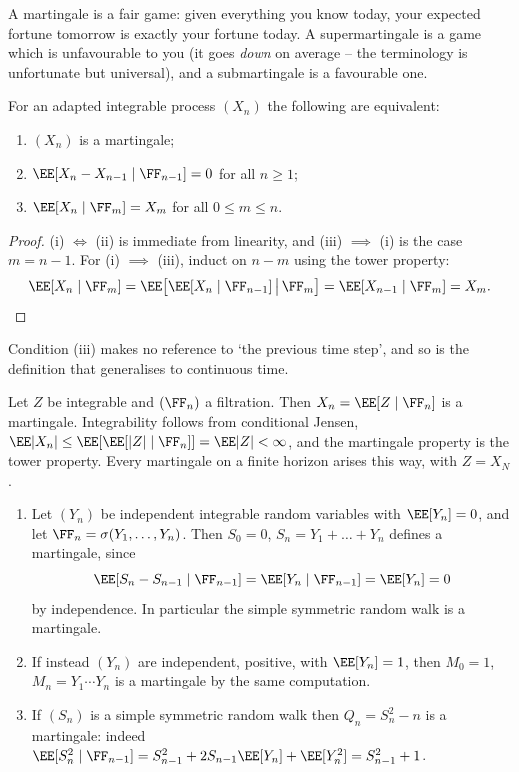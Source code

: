 A martingale is a fair game: given everything you know today, your expected fortune tomorrow is exactly your fortune today. A supermartingale is a game which is unfavourable to you (it goes \emph{down} on average -- the terminology is unfortunate but universal), and a submartingale is a favourable one.

\begin{proposition}\label{prop:mart-equiv}
	For an adapted integrable process $(X_n)$ the following are equivalent:
	\begin{enumerate}[label=(\roman*)]
		\item $(X_n)$ is a martingale;
		\item $\EE[X_n - X_{n-1}\mid\FF_{n-1}] = 0$ for all $n \geq 1$;
		\item $\EE[X_n\mid\FF_m] = X_m$ for all $0 \leq m \leq n$.
	\end{enumerate}
\end{proposition}

\begin{proof}
	(i) $\iff$ (ii) is immediate from linearity, and (iii) $\implies$ (i) is the case $m = n-1$. For (i) $\implies$ (iii), induct on $n - m$ using the tower property:
	$$
	\EE[X_{n}\mid\FF_m] = \EE\big[\EE[X_{n}\mid\FF_{n-1}]\,\big|\,\FF_m\big] = \EE[X_{n-1}\mid\FF_m] = X_m. \qedhere
	$$
\end{proof}

Condition (iii) makes no reference to `the previous time step', and so is the definition that generalises to continuous time.

\begin{example}
	Let $Z$ be integrable and $(\FF_n)$ a filtration. Then $X_n = \EE[Z\mid\FF_n]$ is a martingale. Integrability follows from conditional Jensen, $\EE|X_n| \leq \EE[\EE[|Z|\mid\FF_n]] = \EE|Z| < \infty$, and the martingale property is the tower property. Every martingale on a finite horizon arises this way, with $Z = X_N$.
\end{example}

\begin{example}
	\begin{enumerate}[label=(\roman*)]
		\item Let $(Y_n)$ be independent integrable random variables with $\EE[Y_n] = 0$, and let $\FF_n = \sigma(Y_1,\dots,Y_n)$. Then $S_0 = 0$, $S_n = Y_1 + \dots + Y_n$ defines a martingale, since
		$$
		\EE[S_n - S_{n-1}\mid\FF_{n-1}] = \EE[Y_n\mid\FF_{n-1}] = \EE[Y_n] = 0
		$$
		by independence. In particular the simple symmetric random walk is a martingale.
		\item If instead $(Y_n)$ are independent, positive, with $\EE[Y_n]=1$, then $M_0 = 1$, $M_n = Y_1\cdots Y_n$ is a martingale by the same computation.
		\item If $(S_n)$ is a simple symmetric random walk then $Q_n = S_n^2 - n$ is a martingale: indeed $\EE[S_n^2\mid\FF_{n-1}] = S_{n-1}^2 + 2S_{n-1}\EE[Y_n] + \EE[Y_n^2] = S_{n-1}^2 + 1$.
	\end{enumerate}
\end{example}


